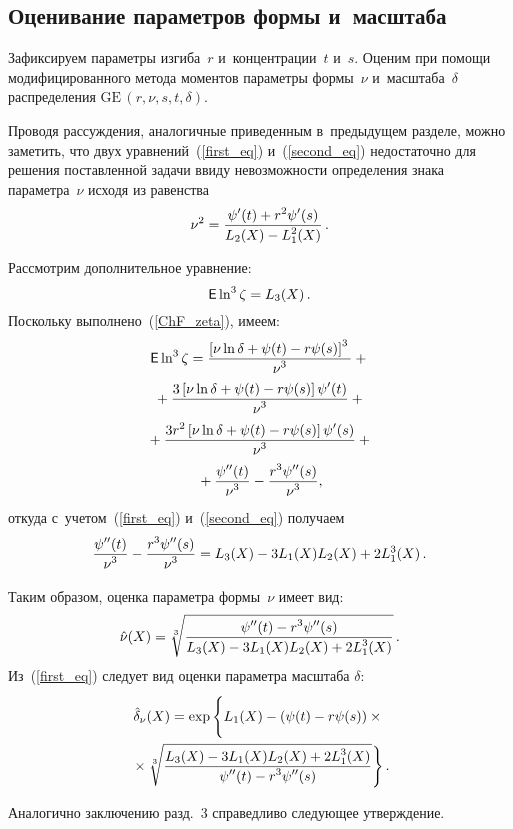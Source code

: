 \begin{multicols}{2}
\section{Оценивание параметров формы и~масштаба}

Зафиксируем параметры изгиба~$r$ и~концентрации~$t$ и~$s$. Оценим при помощи 
модифицированного метода моментов параметры формы~$\nu$ и~масштаба~$\delta$ 
распределения $\mathrm{GE}\,(r,\nu,s,t,\delta)$.

Проводя рассуждения, аналогичные приведенным в~предыдущем разделе, можно 
заметить, что двух уравнений~(\ref{first_eq}) и~(\ref{second_eq}) недостаточно 
для решения поставленной задачи ввиду невозможности определения
 знака параметра~$\nu$ исходя из равенства
$$
\nu^2=\displaystyle\frac{\displaystyle \psi'(t)+r^2\psi'(s)\mathstrut}{\displaystyle L_2(X)-L_1^2(X)\mathstrut}\,.
$$

Рассмотрим дополнительное уравнение:
$$
{\sf E}\ln^3\zeta=L_3(X)\,.
$$
Поскольку выполнено~(\ref{ChF_zeta}), имеем:
\begin{multline*}
{\sf E}\ln^3\zeta=
\displaystyle\frac{\displaystyle \left[\nu\ln\delta+\psi(t)-
r\psi(s)\right]^3\mathstrut}{\displaystyle \nu^3\mathstrut}+{}\\
{}+\displaystyle\frac{\displaystyle 3\left[\nu\ln\delta+\psi(t)
-r\psi(s)\right]\psi'(t)\mathstrut}{\displaystyle \nu^3\mathstrut}+{}
\\
{}+\displaystyle\frac{\displaystyle 3r^2\left[\nu\ln\delta+\psi(t)
-r\psi(s)\right]\psi'(s)\mathstrut}{\displaystyle \nu^3\mathstrut}+{}\\
{}+\displaystyle\frac{\displaystyle \psi''(t)\mathstrut}{\displaystyle \nu^3\mathstrut}-
\displaystyle\frac{\displaystyle r^3\psi''(s)\mathstrut}{\displaystyle \nu^3\mathstrut},
\end{multline*}
откуда с~учетом~(\ref{first_eq}) и~(\ref{second_eq}) получаем
$$
\displaystyle\frac{\displaystyle \psi''(t)\mathstrut}{\displaystyle \nu^3\mathstrut}-\displaystyle\frac{\displaystyle r^3\psi''(s)\mathstrut}{\displaystyle \nu^3\mathstrut}=L_3(X)-
3L_1(X)L_2(X)+2L_1^3(X)\,.
$$

Таким образом, оценка параметра формы~$\nu$ имеет вид:
\begin{equation*}
{\hat \nu}(X)=\sqrt[3]{\displaystyle\frac{\displaystyle \psi''(t)-r^3\psi''(s)\mathstrut}{\displaystyle L_3(X)-
3L_1(X)L_2(X)+2L_1^3(X)\mathstrut}}\,.
\end{equation*}
Из~(\ref{first_eq}) следует вид оценки параметра масштаба $\delta$:
\begin{multline*}
{\hat \delta}_\nu(X)=\exp\left\{
\vphantom{\sqrt[3]{\fr{L_3(X)-3L_1(X)L_2(X)+2L_1^3(X)}{\psi''(t)-r^3\psi''(s)}}}
L_1(X)-(\psi(t)-r\psi(s))\times{}\right.\\
\left.{}\times
\sqrt[3]{\fr{L_3(X)-3L_1(X)L_2(X)+2L_1^3(X)}{\psi''(t)-r^3\psi''(s)}}\right\}.
\end{multline*}

Аналогично заключению разд.~3 справедливо следующее утверждение.

\smallskip


\end{multicols}
